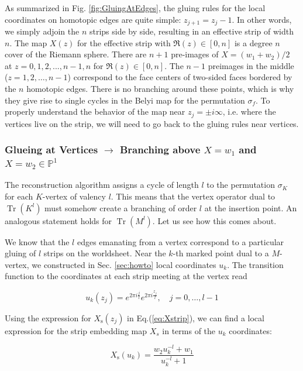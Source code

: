 \documentclass[english]{article}
\DeclareMathOperator{\Tr}{Tr}
\renewcommand{\>}{\rangle}
\newcommand{\<}{\langle}
\renewcommand{\(}{\left(}
\renewcommand{\)}{\right)}
\begin{document}
As summarized in Fig. \ref{fig:GluingAtEdges}, the gluing rules for the local coordinates on homotopic edges are quite simple: $z_{j+1}=z_{j}-1$. In other words, we simply adjoin the $n$ strips side by side, resulting in an effective strip of width $n$. The map $X(z)$ for the effective strip with $\Re(z) \in [0,n]$ is a degree $n$ cover of the Riemann sphere. There are $n+1$ pre-images of $X=(w_1+w_2)/2$ at $z=0,1,2,...,n-1,n$ for $\Re(z) \in [0,n]$. The $n-1$ preimages in the middle ($z= 1, 2, \dots, n-1$) correspond to the face centers of two-sided faces bordered by the $n$ homotopic edges. There is no branching around these points, which is why they give rise to single cycles in the Belyi map for the permutation $\sigma_{f}$. To properly understand the behavior of the map near $z_j= \pm i\infty$, i.e. where the vertices live on the strip, we will need to go back to the gluing rules near vertices.  


\subsubsection*{Glueing at Vertices $\rightarrow$ Branching above $X=w_1$  and $X=w_2 \in \mathbb{P}^1$}

The reconstruction algorithm assigns a cycle of length $l$ to the permutation $\sigma_{K}$ for each $K$-vertex of valency $l$. This means that the vertex operator dual to $\Tr(K^l)$ must somehow create a branching of order $l$ at the insertion point. An analogous statement holds for $\Tr(M^l)$. Let us see how this comes about. 

We know that the $l$ edges emanating from a vertex correspond to a particular gluing of $l$ strips on the worldsheet. Near the $k$-th marked point dual to a $M$-vertex, we constructed in Sec. \ref{sec:howto} local coordinates $u_{k}$. The transition function to the coordinates at each strip meeting at the vertex read

\begin{equation}
    u_{k}(z_{j}) = e^{2\pi i \frac{j}{l}}e^{2 \pi i \frac{z_{j}}{l}}, \quad j = 0, \dots, l-1
\end{equation}

Using the expression for $X_{\text{s}}(z_{j})$ in Eq.(\ref{eq:Xstrip}), we can find a local expression for the strip embedding map $X_s$ in terms of the $u_{k}$ coordinates:

\begin{equation}
   X_{\text{s}}(u_{k})= \frac{w_{2}u_{k}^{-l}+w_{1}}{u_{k}^{-l}+1}
\end{equation}
\end{document}
